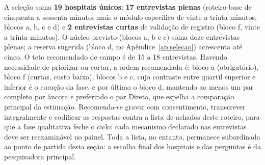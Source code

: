 
A seleção soma \textbf{19 hospitais únicos}: \textbf{17 entrevistas
plenas} (roteiro-base de cinquenta a sessenta minutos mais o módulo
específico de vinte a trinta minutos, blocos a, b, c e d) e \textbf{2
entrevistas curtas} de validação de registro (bloco f, vinte a trinta
minutos). O núcleo previsto (blocos a, b e c) soma doze entrevistas
plenas; a reserva sugerida (bloco d, no
Apêndice~\ref{ap:selecao}) acrescenta até cinco. O teto
recomendado de campo é de 15 a 18 entrevistas. Havendo necessidade de
priorizar ou cortar, a ordem recomendada é: bloco a (obrigatório), bloco
f (curtas, custo baixo), blocos b e c, cujo contraste entre quartil
superior e inferior é o coração da fase, e por último o bloco d,
mantendo ao menos um par completo por âncora e preferindo o par Direta,
que espelha a comparação principal da estimação. Recomenda-se
gravar com consentimento, transcrever integralmente e codificar as
respostas contra a lista de achados deste roteiro, para que a fase
qualitativa feche o ciclo: cada mecanismo declarado nas entrevistas deve
ser reexaminável no painel. Toda a lista, no entanto, permanece
subordinada ao ponto de partida desta seção: a escolha final dos
hospitais e das perguntas é da pesquisadora principal.
